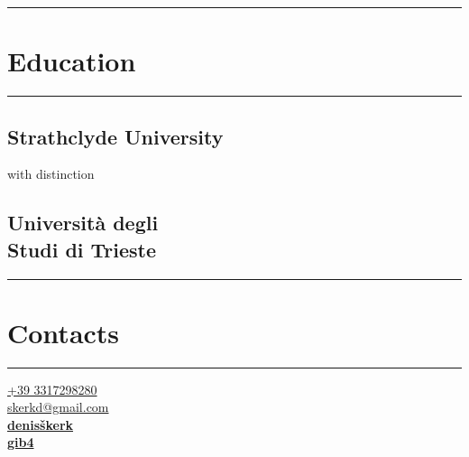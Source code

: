 \documentclass[]{dske-resume-openfont}
\newcommand{\sectionwithlines}[1]{%
    \vspace{0.5cm}%
    {\noindent\rule{\linewidth}{0.4pt}}%
    \section{#1}%
    {\noindent\rule{\linewidth}{0.4pt}}%
    \vspace{0.3cm}%
}
\begin{document}
%
%
\lastupdated

%
%

%
%

\begin{minipage}[t]{0.33\textwidth} 


\sectionwithlines{Education} 

\subsection{Strathclyde University}
with distinction\\
\sectionsep

\subsection{Universit\`{a} degli\\ Studi di Trieste}
\sectionsep



\sectionwithlines{Contacts} 
\faPhone\hspace{0.5em} \href{tel:+393317298280}{+39 3317298280}\\
\faEnvelope\hspace{0.5em} \href{mailto:skerkd@gmail.com}{skerkd@gmail.com} \\
\faLinkedin\hspace{0.5em} \href{https://www.linkedin.com/in/denis-\%C5\%A1kerk/}{\bf denisškerk} \\
\faGithub\hspace{0.5em} \href{https://github.com/gib4}{\bf gib4} \\


\end{minipage}
\end{document}
